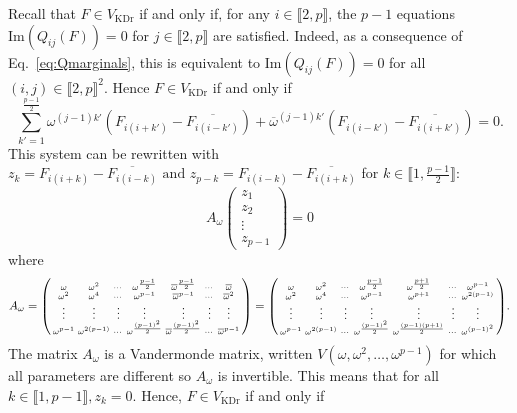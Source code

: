 \documentclass[a4paper, notitlepage, 11pt]{article}
\numberwithin{equation}{section}
\newcommand{\VR}{V_{\mathrm{KDr}}}
\newcommand{\IntEnt}[2]{\llbracket #1 , #2 \rrbracket}
\begin{document}
Recall that $F\in\VR$ if and only if, for any $i\in\IntEnt{2}{p}$, the $p-1$ equations $\text{Im}(Q_{ij}(F))=0$ for $j\in\IntEnt{2}{p}$  are satisfied. Indeed, as a consequence of Eq.~\eqref{eq:Qmarginals}, this is equivalent to $\text{Im}(Q_{ij}(F))=0$ for all $(i,j)\in\IntEnt{2}{p}^2$.
Hence $F\in\VR$ if and only if
\[
 \sum_{k'=1}^{\frac{p-1}{2}}\omega^{(j-1)k'}\left(F_{i (i+k')} - \overline{F_{i (i-k')}}\right) + \overline{\omega}^{(j-1)k'}\left(F_{i (i-k')}- \overline{F_{i (i+k')}}\right) = 0.
\]
This system can be rewritten with $z_k= F_{i (i+k)} - \overline{F_{i (i-k)}} \text{ and } z_{p-k} = F_{i (i-k)}- \overline{F_{i (i+k)}}$ for $k\in\IntEnt{1}{\frac{p-1}{2}}$:
\[
A_{\omega}\begin{pmatrix}
z_1 \\
z_2 \\
\vdots\\
z_{p-1}
\end{pmatrix}=0
\]
where 
\[
A_{\omega} = 
\begin{psmallmatrix}
\omega & \omega^2 & \cdots & \omega^{\frac{p-1}{2}} & \overline{\omega}^{\frac{p-1}{2}} & \cdots & \overline{\omega}\\
\omega^2 & \omega^4 &  \cdots & \omega^{p-1} & \overline{\omega}^{p-1} & \cdots &\overline{\omega}^{2} \\
\vdots &\vdots &  \vdots  & \vdots  & \vdots & \vdots  & \vdots  \\
\omega^{p-1} & \omega^{2(p-1)} &  \cdots & \omega^{\frac{(p-1)^2}{2}} & \overline{\omega}^{\frac{(p-1)^2}{2}} & \cdots & \overline{\omega}^{p-1} \\
\end{psmallmatrix}
= 
\begin{psmallmatrix}
\omega & \omega^2 & \cdots & \omega^{\frac{p-1}{2}} &  \omega^{\frac{p+1}{2}} & \cdots & \omega^{p-1} \\
\omega^2 & \omega^4 &  \cdots & \omega^{p-1} &  \omega^{p+1} & \cdots & \omega^{2(p-1)} \\
\vdots &\vdots &  \vdots  & \vdots  & \vdots & \vdots  & \vdots  \\
\omega^{p-1} & \omega^{2(p-1)} &  \cdots & \omega^{\frac{(p-1)^2}{2}} &  \omega^{\frac{(p-1)(p+1)}{2}} & \cdots & \omega^{(p-1)^2} \\
\end{psmallmatrix} .
\]
The matrix $A_{\omega}$ is a Vandermonde matrix, written $V(\omega, \omega^2, \dots, \omega^{p-1})$ for which all parameters are different so $A_{\omega}$ is invertible. This means that for all $k\in\IntEnt{1}{p-1}, z_{k}=0$. Hence, $F\in\VR$ if and only if
\end{document}
